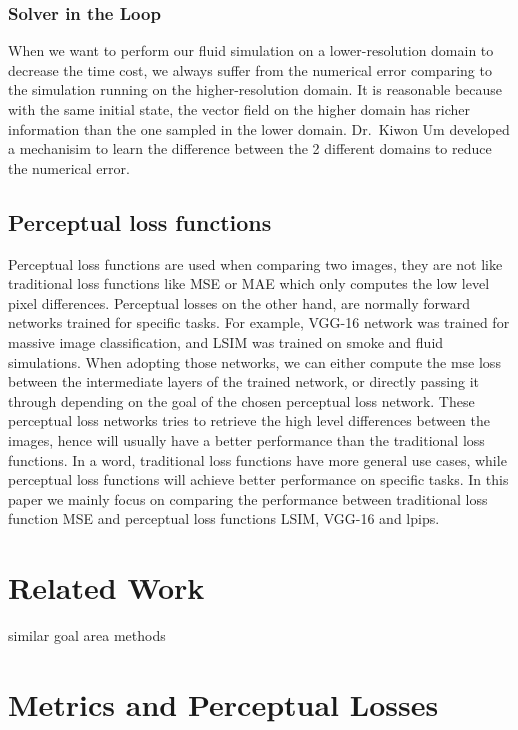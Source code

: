 \documentclass[a4paper,12pt,twoside]{report}
\begin{document}
\subsection{Solver in the Loop}
When we want to perform our fluid simulation on a lower-resolution domain to decrease the time cost, we always suffer from the numerical error comparing to the simulation running on the higher-resolution domain. It is reasonable because with the same initial state, the vector field on the higher domain has richer information than the one sampled in the lower domain. Dr.\ Kiwon Um\cite{um2020sol} developed a mechanisim to learn the difference between the 2 different domains to reduce the numerical error.

\section{Perceptual loss functions}
Perceptual loss functions are used when comparing two images, they are not like traditional loss functions like MSE or MAE which only computes the low level pixel differences. Perceptual losses on the other hand, are normally forward networks trained for specific tasks. For example, VGG-16 network was trained for massive image classification, and LSIM was trained on smoke and fluid simulations. When adopting those networks, we can either compute the mse loss between the intermediate layers of the trained network, or directly passing it through depending on the goal of the chosen perceptual loss network. These perceptual loss networks tries to retrieve the high level differences between the images, hence will usually have a better performance than the traditional loss functions. In a word, traditional loss functions have more general use cases, while perceptual loss functions will achieve better performance on specific tasks.
In this paper we mainly focus on comparing the performance between traditional loss function MSE and perceptual loss functions LSIM, VGG-16 and lpips.




\chapter{Related Work}
similar goal area methods



\chapter{Metrics and Perceptual Losses}
\end{document}
